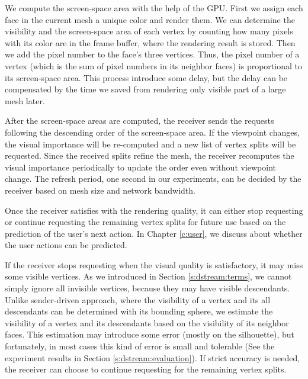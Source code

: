     We compute the screen-space area with the help of the GPU. 
    First we assign each face in the current mesh a unique color and render them. 
    We can determine the visibility
    and the screen-space area of each vertex by counting how many pixels with its color
    are in the frame buffer, where the rendering result is stored. 
    Then we add the pixel number to the face's three vertices. Thus, the
    pixel number of a vertex (which is the sum of pixel numbers in its neighbor faces)
    is proportional to its screen-space area.
    This process introduce some delay, but the delay can be compensated by the time
    we saved from rendering only visible part of a large mesh later. 
    
    After the screen-space areas are computed, 
    the receiver sends the requests following the descending order of the 
    screen-space area. If the viewpoint changes, the visual importance will
    be re-computed and a new list of vertex splits will be requested. Since the received
    splits refine the mesh, the receiver recomputes the visual importance periodically
    to update the order even without viewpoint change. The refresh period, one second
    in our experiments, can be decided
    by the receiver based on mesh size and network bandwidth.

    Once the receiver satisfies with the rendering quality, it 
    can either stop requesting or continue requesting the remaining vertex splits
    for future use based on the prediction of the user's next action. 
    In Chapter \ref{c:user}, we discuss about whether the user actions can be predicted.

    If the receiver stops requesting %
    when the visual quality is satisfactory, it may miss some visible vertices.
    As we introduced in Section \ref{s:dstream:terms}, we cannot simply ignore 
    all invisible vertices, because they may have visible descendants.
    Unlike sender-driven approach, where the visibility of a vertex and its all descendants
    can be determined with its bounding sphere, we estimate the visibility of 
    a vertex and its descendants based on the visibility of its neighbor faces. 
    This estimation may introduce some error (mostly on the silhouette), 
    but fortunately, in most cases this kind of error is small and tolerable
    (See the experiment results in Section \ref{s:dstream:evaluation}).
    If strict accuracy is needed, the receiver can choose to continue requesting 
    for the remaining vertex splits.  
    
